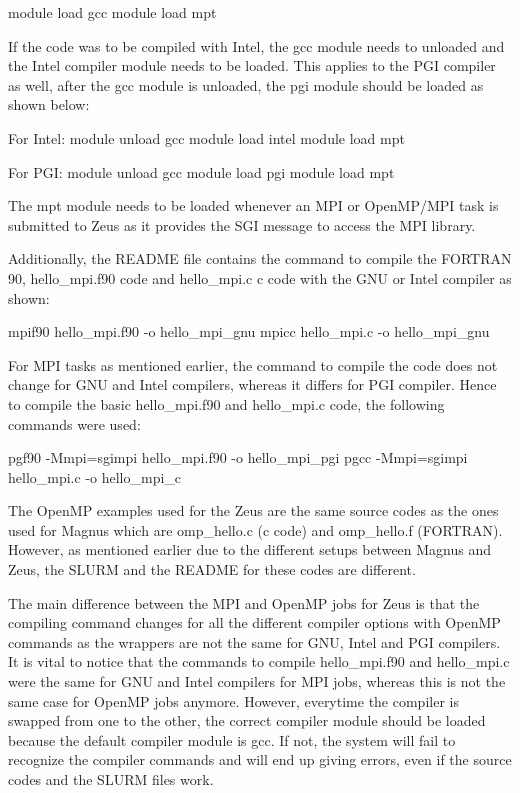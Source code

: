 \begin{Document}
module load gcc
module load mpt

If the code was to be compiled with Intel, the gcc module needs to unloaded and the Intel compiler module needs to be loaded. This applies to the PGI
compiler as well, after the gcc module is unloaded, the pgi module should be loaded as shown below:

For Intel:
module unload gcc
module load intel
module load mpt

For PGI:
module unload gcc
module load pgi
module load mpt

The mpt module needs to be loaded whenever an MPI or OpenMP/MPI task is submitted to Zeus as it provides the SGI message to access the MPI library.

Additionally, the README file contains the command to compile the FORTRAN 90, hello_mpi.f90 code  and hello_mpi.c c code with the GNU or Intel compiler 
as shown:

mpif90 hello_mpi.f90 -o hello_mpi_gnu
mpicc hello_mpi.c -o hello_mpi_gnu

For MPI tasks as mentioned earlier, the command to compile the code does not change for GNU and Intel compilers, whereas it differs for PGI compiler.
Hence to compile the basic hello_mpi.f90 and hello_mpi.c code, the following commands were used:

pgf90 -Mmpi=sgimpi hello_mpi.f90 -o hello_mpi_pgi
pgcc -Mmpi=sgimpi hello_mpi.c -o hello_mpi_c 
  


The OpenMP examples used for the Zeus are the same source codes as the ones used for Magnus which are omp_hello.c (c code) and omp_hello.f (FORTRAN).
However, as mentioned earlier due to the different setups between Magnus and Zeus, the SLURM and the README for these codes are different.

The main difference between the MPI and OpenMP jobs for Zeus is that the compiling command changes for all the different compiler options with OpenMP
commands as the wrappers are not the same for GNU, Intel and PGI compilers. It is vital to notice that the commands to compile hello_mpi.f90 and
hello_mpi.c were the same for GNU and Intel compilers for MPI jobs, whereas this is not the same case for OpenMP jobs anymore. However, everytime the
compiler is swapped from one to the other, the correct compiler module should be loaded because the default compiler module is gcc. If not, the system will fail to recognize the compiler commands
and will end up giving errors, even if the source codes and the SLURM files work.


\end{Document}
